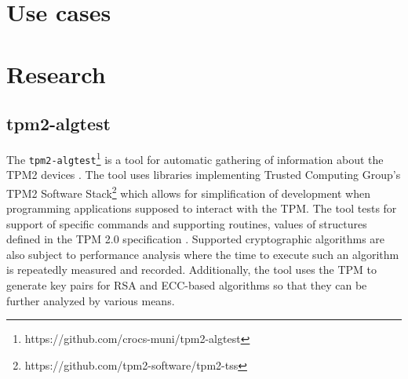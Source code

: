 \section{Use cases}



\section{Research}
\subsection{tpm2-algtest}
The \texttt{tpm2-algtest}\footnote{https://github.com/crocs-muni/tpm2-algtest} is a tool for automatic gathering of information about the TPM2 devices \cite{Struk2019thesis}. The tool uses libraries implementing Trusted Computing Group's TPM2 Software Stack\footnote{https://github.com/tpm2-software/tpm2-tss} which allows for simplification of development when programming applications supposed to interact with the TPM. The tool tests for support of specific commands and supporting routines, values of structures defined in the TPM 2.0 specification \cite{tcg_p3_commands, tcg_p4_supproutines, tcg_p2_structures}. Supported cryptographic algorithms are also subject to performance analysis where the time to execute such an algorithm is repeatedly measured and recorded. Additionally, the tool uses the TPM to generate key pairs for RSA and ECC-based algorithms so that they can be further analyzed by various means.
